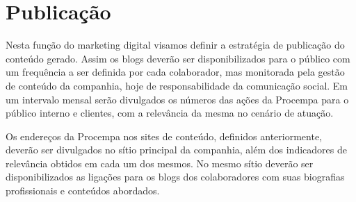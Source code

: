 \chapter{Publicação}

Nesta função do marketing digital visamos definir a estratégia de publicação do conteúdo gerado. Assim os blogs deverão ser disponibilizados para o público com um frequência a ser definida por cada colaborador, mas monitorada pela gestão de conteúdo da companhia, hoje de responsabilidade da comunicação social.
Em um intervalo mensal serão divulgados os números das ações da Procempa para o público interno e clientes, com a relevância da mesma no cenário de atuação.

Os endereços da Procempa nos sites de conteúdo, definidos anteriormente, deverão ser divulgados no sítio principal da companhia, além dos indicadores de relevância obtidos em cada um dos mesmos. No mesmo sítio deverão ser disponibilizados as ligações para os blogs dos colaboradores com suas biografias profissionais e conteúdos abordados.
